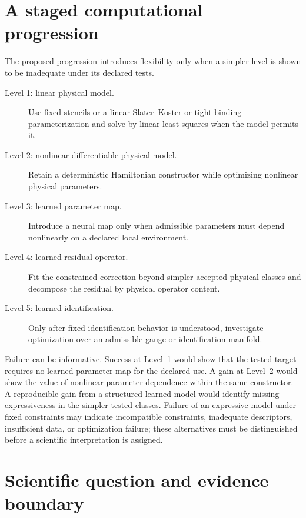 \section{A staged computational progression}

The proposed progression introduces flexibility only when a simpler level is
shown to be inadequate under its declared tests.

\begin{description}
  \item[Level 1: linear physical model.] Use fixed stencils or a linear
    Slater--Koster or tight-binding parameterization and solve by linear least
    squares when the model permits it.
  \item[Level 2: nonlinear differentiable physical model.] Retain a
    deterministic Hamiltonian constructor while optimizing nonlinear physical
    parameters.
  \item[Level 3: learned parameter map.] Introduce a neural map only when
    admissible parameters must depend nonlinearly on a declared local
    environment.
  \item[Level 4: learned residual operator.] Fit the constrained correction
    beyond simpler accepted physical classes and decompose the residual by
    physical operator content.
  \item[Level 5: learned identification.] Only after fixed-identification
    behavior is understood, investigate optimization over an admissible gauge
    or identification manifold.
\end{description}

Failure can be informative. Success at Level~1 would show that the tested target
requires no learned parameter map for the declared use. A gain at Level~2 would
show the value of nonlinear parameter dependence within the same constructor.
A reproducible gain from a structured learned model would identify missing
expressiveness in the simpler tested classes. Failure of an expressive model
under fixed constraints may indicate incompatible constraints, inadequate
descriptors, insufficient data, or optimization failure; these alternatives
must be distinguished before a scientific interpretation is assigned.

\section{Scientific question and evidence boundary}

